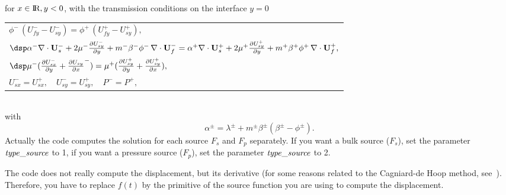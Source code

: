 \documentclass[11pt,a4]{article}
\begin{document}
for $x\in\hbox{I}\!\hbox{R}, y<0$, with the transmission conditions on the interface $y=0$ \\[10pt]
\begin{tabular}{|l}
$\phi^-\,(U_{fy}^--U_{sy}^-)=\phi^+\,(U_{fy}^+-U_{sy}^+),$\\[12pt]
$\dsp \alpha^-\nabla\cdot \mathbf U_s^-
+2\mu^-\derp{ U_{sy}^-}{y}+m^-\beta^-\phi^-\,\nabla\cdot \mathbf U_f^-=
\alpha^+\nabla\cdot \mathbf U_s^+
+2\mu^+\derp{U_{sy}^+}{y} + m^+\beta^+\phi^+\,\nabla\cdot \mathbf U_f^+,$\\[12pt]
$\dsp \mu^-(\derp {U_{sx}^-}{y}+\derp{U_{sy}}{x}^-)=
\mu^+(\derp{ U_{sy}^+}{y} + \derp {U_{sy}^+}{x}),$\\[12pt]
$U_{sx}^-=U_{sx}^+,\quad  U_{sy}^-=U_{sy}^+,\quad P^-=P^+,$
\end{tabular} 
\\[10pt]
with 
$$
\alpha^\pm=\lambda^\pm+m^\pm\beta^\pm(\beta^\pm-\phi^\pm).
$$
Actually the code computes the solution for each
source $F_s$ and $F_p$ separately. If you want a
bulk source ($F_s$), set the parameter
$\it type\_source$ to 1, if you want a pressure source
($F_p$), set the parameter
$\it type\_source$ to 2. 
\begin{Remark}
  The code does not really compute the
  displacement, but its derivative (for some reasons
  related to the Cagniard-de Hoop method,
  see~\cite{ezziani_th,Rap3}). Therefore, you have to
  replace $f(t)$ by the primitive of the source
  function you are using to compute the displacement. 
\end{Remark}

 
\end{document}

